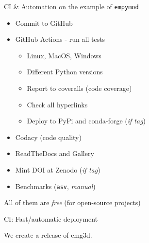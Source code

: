 \documentclass[aspectratio=169]{beamer}
\begin{document}
\begin{frame}
  {CI \& Automation on the example of \texttt{empymod}}

  \begin{itemize}
    \item Commit to GitHub
    \item GitHub Actions - run all tests
      \begin{itemize}
        \item Linux, MacOS, Windows
        \item Different Python versions
        \item Report to coveralls (code coverage)
        \item Check all hyperlinks
        \item Deploy to PyPi and conda-forge (\emph{if tag})
      \end{itemize}
    \item Codacy (code quality)
    \item ReadTheDocs and Gallery
    \item Mint DOI at Zenodo (\emph{if tag})
    \item Benchmarks (\texttt{asv}, \emph{manual})
  \end{itemize}

  \vfill

  \alert{All of them are \emph{free} (for open-source projects)}

\end{frame}

\begin{frame}
  {CI: Fast/automatic deployment}

  \alert{We create a release of emg3d.}

\end{frame}
\end{document}
